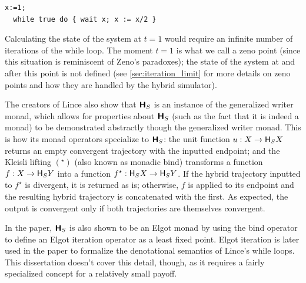\begin{lstlisting}[caption=Hybrid program resulting in a closed divergent trajectory]
  x:=1;
  while true do { wait x; x := x/2 }
\end{lstlisting}

Calculating the state of the system at $t=1$ would require an infinite number of iterations of the while loop. The moment $t=1$ is what we call a zeno point (since this situation is reminiscent of Zeno's paradoxes); the state of the system at and after this point is not defined (see \cref{sec:iteration_limit} for more details on zeno points and how they are handled by the hybrid simulator).

The creators of Lince also show that $\textbf{\textsf{H}}_S$ is an instance of the generalized writer monad, which allows for properties about $\textbf{\textsf{H}}_S$ (such as the fact that it is indeed a monad) to be demonstrated abstractly though the generalized writer monad. This is how its monad operators specialize to $\textbf{\textsf{H}}_S$: the unit function $u : X \rightarrow \textsf{H}_S X$ returns an empty convergent trajectory with the inputted endpoint; and the Kleisli lifting $(^\star)$ (also known as monadic bind) transforms a function $f : X \rightarrow \textsf{H}_S Y$ into a function $f^\star : \textsf{H}_S X \rightarrow \textsf{H}_S Y$. If the hybrid trajectory inputted to $f^\star$ is divergent, it is returned as is; otherwise, $f$ is applied to its endpoint and the resulting hybrid trajectory is concatenated with the first. As expected, the output is convergent only if both trajectories are themselves convergent.

In the paper, $\textbf{\textsf{H}}_S$ is also shown to be an Elgot monad \cite{ELGOT1975175} by using the bind operator to define an Elgot iteration operator as a least fixed point. Elgot iteration is later used in the paper to formalize the denotational semantics of Lince's while loops. This dissertation doesn't cover this detail, though, as it requires a fairly specialized concept for a relatively small payoff.